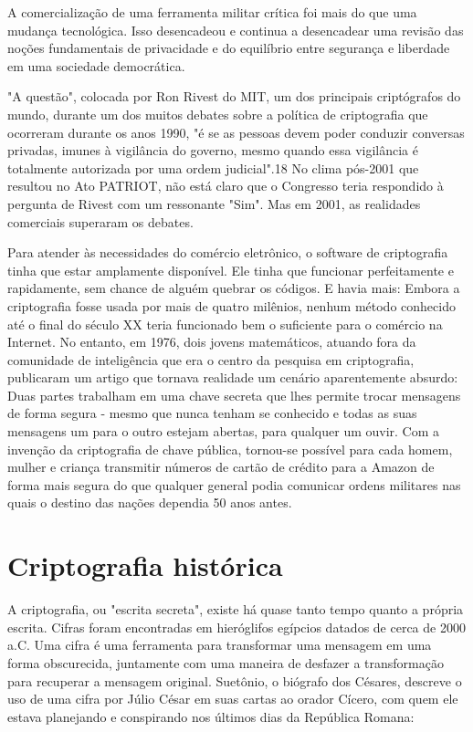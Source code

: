 \documentclass{book}
\begin{document}
A comercialização de uma ferramenta militar crítica foi mais do que uma mudança tecnológica. Isso desencadeou e continua a desencadear uma revisão das noções fundamentais de privacidade e do equilíbrio entre segurança e liberdade em uma sociedade democrática.

"A questão", colocada por Ron Rivest do MIT, um dos principais criptógrafos do mundo, durante um dos muitos debates sobre a política de criptografia que ocorreram durante os anos 1990, "é se as pessoas devem poder conduzir conversas privadas, imunes à vigilância do governo, mesmo quando essa vigilância é totalmente autorizada por uma ordem judicial".18 No clima pós-2001 que resultou no Ato PATRIOT, não está claro que o Congresso teria respondido à pergunta de Rivest com um ressonante "Sim". Mas em 2001, as realidades comerciais superaram os debates.

Para atender às necessidades do comércio eletrônico, o software de criptografia tinha que estar amplamente disponível. Ele tinha que funcionar perfeitamente e rapidamente, sem chance de alguém quebrar os códigos. E havia mais: Embora a criptografia fosse usada por mais de quatro milênios, nenhum método conhecido até o final do século XX teria funcionado bem o suficiente para o comércio na Internet. No entanto, em 1976, dois jovens matemáticos, atuando fora da comunidade de inteligência que era o centro da pesquisa em criptografia, publicaram um artigo que tornava realidade um cenário aparentemente absurdo: Duas partes trabalham em uma chave secreta que lhes permite trocar mensagens de forma segura - mesmo que nunca tenham se conhecido e todas as suas mensagens um para o outro estejam abertas, para qualquer um ouvir. Com a invenção da criptografia de chave pública, tornou-se possível para cada homem, mulher e criança transmitir números de cartão de crédito para a Amazon de forma mais segura do que qualquer general podia comunicar ordens militares nas quais o destino das nações dependia 50 anos antes.

\section{Criptografia histórica}
\label{segredos:historica}

A criptografia, ou "escrita secreta", existe há quase tanto tempo quanto a própria escrita. Cifras foram encontradas em hieróglifos egípcios datados de cerca de 2000 a.C. Uma cifra é uma ferramenta para transformar uma mensagem em uma forma obscurecida, juntamente com uma maneira de desfazer a transformação para recuperar a mensagem original. Suetônio, o biógrafo dos Césares, descreve o uso de uma cifra por Júlio César em suas cartas ao orador Cícero, com quem ele estava planejando e conspirando nos últimos dias da República Romana:
\end{document}
